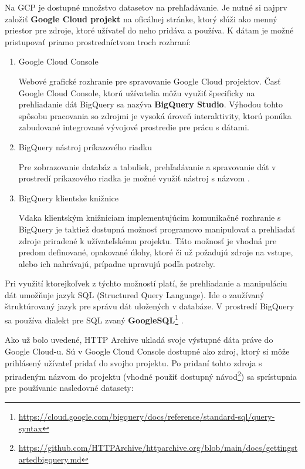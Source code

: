 Na GCP je dostupné množstvo datasetov na prehľadávanie.
Je nutné si najprv založiť \textbf{Google Cloud projekt} na oficálnej stránke, ktorý slúži ako menný priestor pre zdroje, ktoré užívateľ do neho pridáva a používa.
K dátam je možné pristupovať priamo prostredníctvom troch rozhraní: \cite{google-cloud} 
\begin{enumerate}
    \item Google Cloud Console

    Webové grafické rozhranie pre spravovanie Google Cloud projektov. 
    Časť Google Cloud Console, ktorú užívatelia môžu využiť špecificky na prehliadanie dát BigQuery sa nazýva \textbf{BigQuery Studio}.
    Výhodou tohto spôsobu pracovania so zdrojmi je vysoká úroveň interaktivity, ktorú ponúka zabudované integrované vývojové prostredie pre prácu s dátami. 
    
    \item BigQuery nástroj príkazového riadku

    Pre zobrazovanie databáz a tabuliek, prehľadávanie a spravovanie dát v prostredí príkazového riadka je možné využiť nástroj s názvom \textbf{}. 
    
    \item BigQuery klientske knižnice

    Vďaka klientským knižniciam implementujúcim komunikačné rozhranie s BigQuery je taktiež dostupná možnosť programovo manipulovať a prehliadať zdroje priradené k užívateľskému projektu.
    Táto možnosť je vhodná pre predom definované, opakované úlohy, ktoré či už požadujú zdroje na vstupe, alebo ich nahrávajú, prípadne upravujú podľa potreby.
\end{enumerate}

Pri využití ktorejkoľvek z týchto možností platí, že prehliadanie a manipuláciu dát umožňuje jazyk SQL (Structured Query Language).
Ide o zaužívaný štruktúrovaný jazyk pre správu dát uložených v databáze.
V prostredí BigQuery sa používa dialekt pre SQL zvaný \textbf{GoogleSQL}\footnote{\href{https://cloud.google.com/bigquery/docs/reference/standard-sql/query-syntax}{https://cloud.google.com/bigquery/docs/reference/standard-sql/query-syntax}} \cite{google-bq}.

Ako už bolo uvedené, HTTP Archive ukladá svoje výstupné dáta práve do Google Cloud-u.
Sú v Google Cloud Console dostupné ako zdroj, ktorý si môže prihlásený užívateľ pridať do svojho projektu.
Po pridaní tohto zdroja s priradeným názvom  do projektu (vhodné použiť dostupný návod\footnote{\href{https://github.com/HTTPArchive/httparchive.org/blob/main/docs/gettingstarted\_bigquery.md}{https://github.com/HTTPArchive/httparchive.org/blob/main/docs/gettingstarted\textunderscore bigquery.md}}) sa sprístupnia pre používanie nasledovné datasety: \cite{httparchive-repo}

